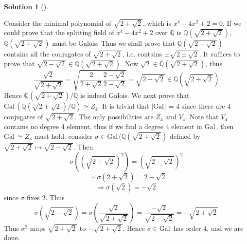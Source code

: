\documentclass{article}
\theoremstyle{definition}
\newtheorem*{sol}{Solution}
\newenvironment{sols}[1][]{%
  \begin{sol}[#1]$ $\par\nobreak\ignorespaces
}{%
  \end{sol}
}
\newcommand{\QQ}{\mathbb Q}
\newcommand{\Ra}{\Rightarrow}
\newcommand{\Gal}{\text{Gal}\,}
\begin{document}
\begin{sols}
	Consider the minimal polynomial of $\sqrt{2 + \sqrt{2}}$, which is $x^4 - 4 x^2 + 2 = 0$.
	If we could prove that the splitting field of $x^4 - 4 x^2 + 2$ over $\QQ$ is $\QQ(\sqrt{2 + \sqrt{2}})$, $\QQ(\sqrt{2 + \sqrt{2}})$ must be Galois.
	Thus we shall prove that $\QQ(\sqrt{2 + \sqrt{2}})$ contains all the conjugates of $\sqrt{2 + \sqrt{2}}$, i.e. contains $\pm \sqrt{2 \pm \sqrt{2}}$.
	It suffices to prove that $\sqrt{2 - \sqrt{2}} \in \QQ(\sqrt{2 + \sqrt{2}})$.
	Now $\sqrt{2} \in \QQ(\sqrt{2 + \sqrt{2}})$, thus 
	\[
		\frac{\sqrt{2}}{\sqrt{2 + \sqrt{2}}} = \sqrt{\frac{2}{2 + \sqrt{2}} \frac{2 - \sqrt{2}}{2 - \sqrt{2}}} = \sqrt{2 - \sqrt{2}} \in \QQ\left(\sqrt{2 + \sqrt{2}}\right)
	\]
	Hence $\QQ(\sqrt{2 + \sqrt{2}})/\QQ$ is indeed Galois.
	We next prove that $\Gal(\QQ(\sqrt{2 + \sqrt{2}})/\QQ) \simeq Z_4$.
	It is trivial that $|\Gal| = 4$ since there are 4 conjugates of $\sqrt{2 + \sqrt{2}}$.
	The only possibilities are $Z_4$ and $V_4$.
	Note that $V_4$ contains no degree 4 element, thus if we find a degree 4 element in $\Gal$, then $\Gal \simeq Z_4$ must hold.
	consider $\sigma \in \Gal(\QQ(\sqrt{2 + \sqrt{2}})$ defined by $\sqrt{2 + \sqrt{2}} \mapsto \sqrt{2 - \sqrt{2}}$.
	Then 
	\[
		\sigma\left( \left( \sqrt{2 + \sqrt{2}} \right)^2 \right) = \left( \sqrt{2 - \sqrt{2}} \right)^2
	\]
	\[
		\Ra \sigma(2 + \sqrt{2}) = 2 - \sqrt{2}
	\]
	\[
		\Ra \sigma(\sqrt{2}) = - \sqrt{2}
	\]
	since $\sigma$ fixes $2$.
	Thus
	\[
		\sigma \left( \sqrt{2 - \sqrt{2}}\right) = \sigma \left( \frac{\sqrt{2}}{\sqrt{2 + \sqrt{2}}} \right) = \frac{- \sqrt{2}}{\sqrt{2 - \sqrt{2}}} = -\sqrt{2 + \sqrt{2}}
	\]
	Thus $\sigma^2$ maps $\sqrt{2 + \sqrt{2}}$ to $-\sqrt{2 + \sqrt{2}}$.
	Hence $\sigma \in \Gal$ has order 4, and we are done.
\end{sols}
\end{document}
